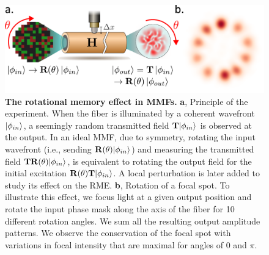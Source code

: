 \documentclass[aps,prl,twocolumn, amsmath,amssymb,superscriptaddress]{revtex4-2}
\DeclarePairedDelimiter\ket{\lvert}{\rangle}
\begin{document}
\begin{figure}[ht]
\includegraphics[width=0.99\columnwidth]{images/Fig1.pdf}
\caption{
    \textbf{The rotational memory effect in MMFs.}
    \textbf{a}, Principle of the experiment.
    When the fiber is illuminated by a coherent wavefront $\ket{\phi_{in}}$,
    a seemingly random transmitted field ${\mathbf{T}}\ket{\phi_{in}}$
    is observed at the output.
    In an ideal MMF, due to symmetry, rotating the input wavefront (i.e., sending ${\mathbf{R}(\theta)}\ket{\phi_{in}}$)
    and measuring the transmitted field ${\mathbf{T}\mathbf{R}(\theta)}\ket{\phi_{in}}$,
    is equivalent to rotating the output field for the initial excitation
    ${\mathbf{R}(\theta)\mathbf{T}}\ket{\phi_{in}}$.
    A local perturbation is later added to study its effect on the RME.
    \textbf{b}, Rotation of a focal spot.
    To illustrate this effect,
    we focus light at a given output position
    and rotate the input phase mask along the axis of the fiber
    for 10 different rotation angles.
    We sum all the resulting output amplitude patterns.
    We observe the conservation of the focal spot
    with variations in focal intensity
    that are maximal for angles of $0$ and $\pi$.
}
\label{fig:setupSimple}
\end{figure}
\end{document}
